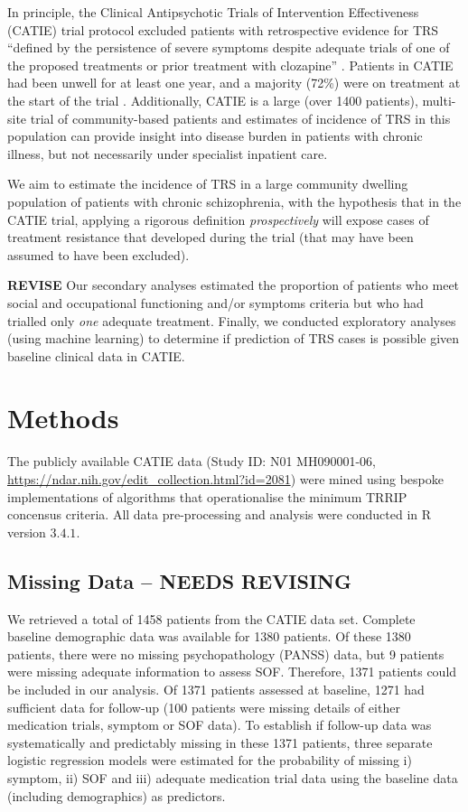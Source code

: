 \documentclass[a4paper,nobib]{article}
\begin{document}
In principle, the Clinical Antipsychotic Trials of Intervention Effectiveness (CATIE) trial protocol excluded patients with retrospective evidence for TRS ``defined by the persistence of severe symptoms despite adequate trials of one of the proposed treatments or prior treatment with clozapine'' \citep{Lieberman2005}.  Patients in CATIE had been unwell for at least one year, and a majority (72\%) were on treatment at the start of the trial \citep{Lieberman2005}.  Additionally, CATIE is a large (over 1400 patients), multi-site trial of community-based patients and estimates of incidence of TRS in this population can provide insight into disease burden in patients with chronic illness, but not necessarily under specialist inpatient care.  

We aim to estimate the incidence of TRS in a large community dwelling population of patients with chronic schizophrenia, with the hypothesis that in the CATIE trial, applying a rigorous definition \emph{prospectively} will expose cases of treatment resistance that developed during the trial (that may have been assumed to have been excluded).  

\textbf{REVISE}
Our secondary analyses estimated the proportion of patients who meet social and occupational functioning and/or symptoms criteria but who had trialled only \emph{one} adequate treatment.  Finally, we conducted exploratory analyses (using machine learning) to determine if prediction of TRS cases is possible given baseline clinical data in CATIE.

\section{Methods}
The publicly available CATIE data (Study ID: N01 MH090001-06, \url{https://ndar.nih.gov/edit_collection.html?id=2081}) were mined using bespoke implementations of algorithms that operationalise the minimum TRRIP concensus criteria.  All data pre-processing and analysis were conducted in \textsf{R} version $3.4.1$.

\subsection{Missing Data -- NEEDS REVISING}
We retrieved a total of 1458 patients from the CATIE data set. Complete baseline demographic data was available for 1380 patients.  Of these 1380 patients, there were no missing psychopathology (PANSS) data, but 9 patients were missing adequate information to assess SOF. Therefore, 1371 patients could be included in our analysis.  Of 1371 patients assessed at baseline, 1271 had sufficient data for follow-up (100 patients were missing details of either medication trials, symptom or SOF data).  To establish if follow-up data was systematically and predictably missing in these 1371 patients, three separate logistic regression models were estimated for the probability of missing i) symptom, ii) SOF and iii) adequate medication trial data using the baseline data (including demographics) as predictors. 
\end{document}
